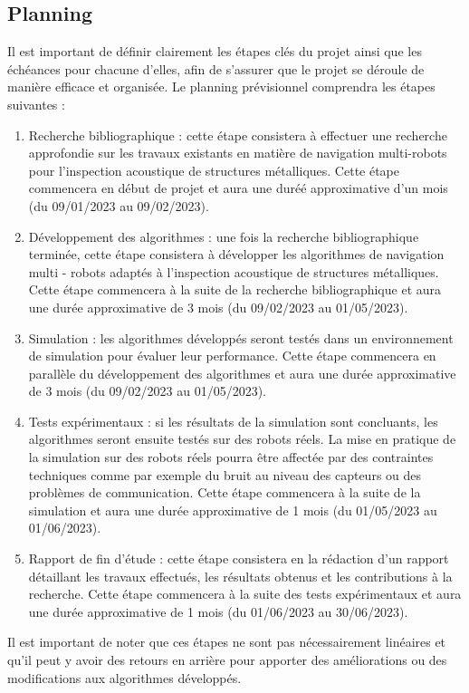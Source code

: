 \documentclass[init,francais,RandD]{rapportPFE}
\begin{document}
		\subsection{Planning}
			Il est important de définir clairement les étapes clés du projet ainsi que les échéances pour chacune d'elles, afin de s'assurer que le projet se déroule de manière efficace et organisée. Le planning prévisionnel comprendra les étapes suivantes :
			\begin{enumerate}
				\item Recherche bibliographique : cette étape consistera à effectuer une recherche approfondie sur les travaux existants en matière de navigation multi-robots pour l'inspection acoustique de structures métalliques. Cette étape commencera en début de projet et aura une duréé approximative d'un mois (du 09/01/2023 au 09/02/2023).
				\item Développement des algorithmes : une fois la recherche bibliographique terminée, cette étape consistera à développer les algorithmes de navigation multi - robots adaptés à l'inspection acoustique de structures métalliques. Cette étape commencera à la suite de la recherche bibliographique et aura une durée approximative de 3 mois (du 09/02/2023 au 01/05/2023).
				\item Simulation : les algorithmes développés seront testés dans un environnement de simulation pour évaluer leur performance. Cette étape commencera en parallèle du développement des algorithmes et aura une durée approximative de 3 mois (du 09/02/2023 au 01/05/2023).
				\item Tests expérimentaux : si les résultats de la simulation sont concluants, les algorithmes seront ensuite testés sur des robots réels. La mise en pratique de la simulation sur des robots réels pourra être affectée par des contraintes techniques comme par exemple du bruit au niveau des capteurs ou des problèmes de communication. Cette étape commencera à la suite de la simulation et aura une durée approximative de 1 mois (du 01/05/2023 au 01/06/2023).
				\item Rapport de fin d'étude : cette étape consistera en la rédaction d'un rapport détaillant les travaux effectués, les résultats obtenus et les contributions à la recherche. Cette étape commencera à la suite des tests expérimentaux et aura une durée approximative de 1 mois (du 01/06/2023 au 30/06/2023).
			\end{enumerate}
			Il est important de noter que ces étapes ne sont pas nécessairement linéaires et qu'il peut y avoir des retours en arrière pour apporter des améliorations ou des modifications aux algorithmes développés.
\end{document}
